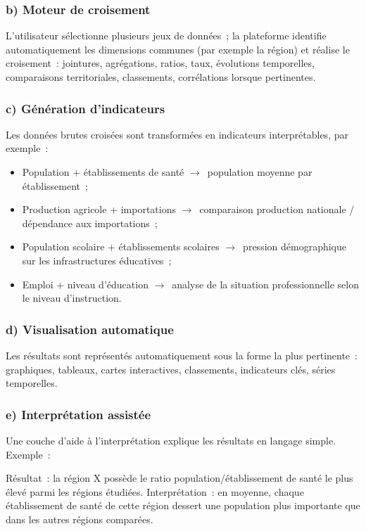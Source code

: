 \documentclass[11pt,a4paper]{article}
\newcommand{\arrowto}{$\rightarrow$}
\begin{document}
\subsubsection{b) Moteur de croisement}
L'utilisateur sélectionne plusieurs jeux de données~; la plateforme identifie automatiquement les dimensions communes (par exemple la région) et réalise le croisement~: jointures, agrégations, ratios, taux, évolutions temporelles, comparaisons territoriales, classements, corrélations lorsque pertinentes.

\subsubsection{c) Génération d'indicateurs}
Les données brutes croisées sont transformées en indicateurs interprétables, par exemple~:
\begin{itemize}
  \item Population + établissements de santé \arrowto\ population moyenne par établissement~;
  \item Production agricole + importations \arrowto\ comparaison production nationale / dépendance aux importations~;
  \item Population scolaire + établissements scolaires \arrowto\ pression démographique sur les infrastructures éducatives~;
  \item Emploi + niveau d'éducation \arrowto\ analyse de la situation professionnelle selon le niveau d'instruction.
\end{itemize}

\subsubsection{d) Visualisation automatique}
Les résultats sont représentés automatiquement sous la forme la plus pertinente~: graphiques, tableaux, cartes interactives, classements, indicateurs clés, séries temporelles.

\subsubsection{e) Interprétation assistée}
Une couche d'aide à l'interprétation explique les résultats en langage simple. Exemple~:

\begin{quotebox}
Résultat~: la région X possède le ratio population/établissement de santé le plus élevé parmi les régions étudiées. Interprétation~: en moyenne, chaque établissement de santé de cette région dessert une population plus importante que dans les autres régions comparées.
\end{quotebox}
\end{document}
